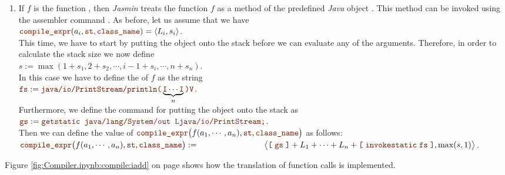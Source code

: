 \begin{enumerate}
\item If $f$ is the function , then \textsl{Jasmin} treats the function $f$ as a method of the
      predefined \textsl{Java} object .
      This method can be invoked using the assembler command
      .  As before, let us assume that we have
      \\[0.2cm]
      \hspace*{1.3cm}
      $\mytt{compile\_expr}(a_i, \mytt{st}, \mytt{class\_name}) = \pair(L_i, s_i)$.
      \\[0.2cm]
      This time, we have to start by putting the object  onto the stack before we
      can evaluate any of the arguments.  Therefore, in order to calculate the stack size we now define
      \\[0.2cm]
      \hspace*{1.3cm}
      $s := \max(1 + s_1, 2 + s_2, \cdots, i - 1 + s_i, \cdots, n + s_n)$.
      \\[0.2cm]
      In this case we have to define the   of $f$ as the string
      \\[0.2cm]
      \hspace*{1.3cm}
      $\mytt{fs} := \mytt{java/io/PrintStream/println(}\underbrace{\mytt{I}\cdots\mytt{I}}_{n}\mytt{)V}$.
      \\[0.2cm]
      Furthermore, we define the command  for putting the object  onto the
      stack as 
      \\[0.2cm]
      \hspace*{1.3cm}
      $\mytt{gs} :=  \mytt{getstatic java/lang/System/out Ljava/io/PrintStream;}$.
      \\[0.2cm]
      Then we can define the
      value of
      $\mytt{compile\_expr}\bigl(f(a_1,\cdots,a_n), \mytt{st}, \mytt{class\_name}\bigr)$ as follows:
      \\[0.2cm]
      \hspace*{1.3cm}
      $\mytt{compile\_expr}\bigl(f(a_1,\cdots,a_n), \mytt{st}, \mytt{class\_name}\bigr) := \\[0.1cm]
      \hspace*{2.8cm} \bigl\langle \mytt{[} \;\mytt{gs} \;\mytt{]} + L_1 + \cdots + L_n +
                   \mytt{[} \; \mytt{invokestatic}\; \mytt{fs} \;\mytt{]}, \max(s,1)\bigr\rangle$.
      \end{enumerate}

Figure \ref{fig:Compiler.ipynb:compile:iadd} on page \pageref{fig:Compiler.ipynb:compile:iadd} shows how the
translation of function calls is implemented.  

